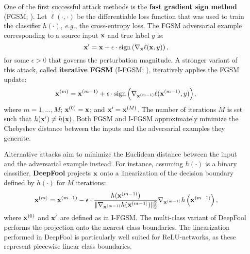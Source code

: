 
One of the first successful attack methods
is the \textbf{fast gradient sign method} (FGSM; \cite{goodfellow2015explaining}). Let $\ell(\cdot, \cdot)$ be the differentiable loss function that was used to train the classifier $h(\cdot)$, \emph{e.g.}, the cross-entropy loss. The FGSM adversarial example corresponding to a source input $\mathbf{x}$ and true label $y$ is:
\begin{equation}
\label{fgsm}
\mathbf{x}' = \mathbf{x} + \epsilon \cdot \operatorname{sign}\left(\nabla_{\mathbf{x}} \ell(\mathbf{x}, y)\right),
\end{equation}
for some $\epsilon \!>\! 0$ that governs the perturbation magnitude. A stronger variant of this attack, called
\textbf{iterative FGSM} (I-FGSM; \cite{kurakin2016physical}), iteratively applies the FGSM update:
\begin{equation}
\label{ifgsm}
\mathbf{x}^{(m)} = \mathbf{x}^{(m-1)} + \epsilon \cdot \operatorname{sign}\left(\nabla_{\mathbf{x}^{(m-1)}} \ell(\mathbf{x}^{(m-1)}, y)\right),
\end{equation}
where $m = 1,\ldots,M$; $\mathbf{x}^{(0)} = \mathbf{x}$; and $\mathbf{x}' = \mathbf{x}^{(M)}$. The number of iterations $M$ is set such that $h(\mathbf{x}') \neq h(\mathbf{x})$. Both FGSM and I-FGSM approximately minimize the Chebyshev distance between the inputs and the adversarial
examples they generate. 

Alternative attacks aim to minimize the Euclidean distance between the input and the adversarial example instead. For instance, assuming $h(\cdot)$ is a binary classifier, \textbf{DeepFool}
\citep{dezfooli2016deepfool} projects $\mathbf{x}$ onto a linearization of the decision boundary defined by $h(\cdot)$ for $M$ iterations:
\begin{equation}
\mathbf{x}^{(m)} = \mathbf{x}^{(m-1)} - \epsilon \cdot \frac{h(\mathbf{x}^{(m-1)})}{\lVert \nabla_{\mathbf{x}^{(m-1)}} h(\mathbf{x}^{(m-1)}) \rVert_2^2} \nabla_{\mathbf{x}^{(m-1)}} h\left(\mathbf{x}^{(m-1)}\right),
\end{equation}
where $\mathbf{x}^{(0)}$ and $\mathbf{x}'$ are defined as in I-FGSM. The multi-class variant of DeepFool performs the projection onto the nearest class boundaries. The linearization performed in DeepFool is particularly well suited for ReLU-networks, as these represent piecewise linear class boundaries. 

